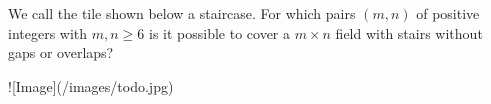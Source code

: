 We call the tile shown below a staircase. For which pairs $(m,n)$ of positive integers
with $m,n\geq 6$ is it possible to cover a $m\times n$ field with stairs without gaps or overlaps?

![Image](/images/todo.jpg)
